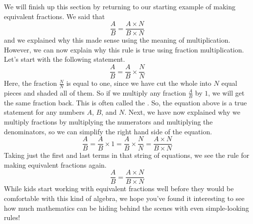 \documentclass{ximera}
\begin{document}
We will finish up this section by returning to our starting example of making equivalent fractions. We said that 
\[
\frac{A}{B} = \frac{A \times N}{B \times N}
\]
and we explained why this made sense using the meaning of multiplication. However, we can now explain why this rule is true using fraction multiplication. Let's start with the following statement.
\[
\frac{A}{B} = \frac{A}{B} \times \frac{N}{N}
\]
Here, the fraction $\frac{N}{N}$ is equal to one, since we have cut the whole into $N$ equal pieces and shaded all of them. So if we multiply any fraction $\frac{A}{B}$ by $1$, we will get the same fraction back. This is often called the .  So, the equation above is a true statement for any numbers $A$, $B$, and $N$. Next, we have now explained why we multiply fractions by multiplying the numerators and multiplying the denominators, so we can simplify the right hand side of the equation.
\[
\frac{A}{B} = \frac{A}{B} \times 1 = \frac{A}{B} \times \frac{N}{N} = \frac{A \times N}{B \times N}
\]
Taking just the first and last terms in that string of equations, we see the rule for making equivalent fractions again.
\[
\frac{A}{B} = \frac{A \times N}{B \times N}
\]
While kids start working with equivalent fractions well before they would be comfortable with this kind of algebra, we hope you've found it interesting to see how much mathematics can be hiding behind the scenes with even simple-looking rules!
\end{document}
